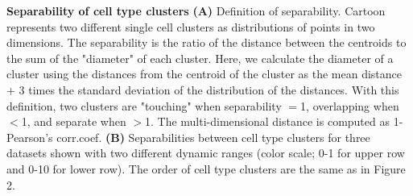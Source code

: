 \textbf{Separability of cell type clusters}
\textbf{(A)} Definition of separability. Cartoon represents two different single cell clusters as distributions of points in two dimensions. The separability is the ratio of the distance between the centroids to the sum of the "diameter" of each cluster. Here, we calculate the diameter of a cluster using the distances from the centroid of the cluster as the mean distance $+$ 3 times the standard deviation of the distribution of the distances. With this definition, two clusters are "touching" when separability $=$1, overlapping when $<$1, and separate when $>$1. The multi-dimensional distance is computed as 1- Pearson's corr.coef.
\textbf{(B)} Separabilities between cell type clusters for three datasets shown with two different dynamic ranges (color scale; 0-1 for upper row and 0-10 for lower row).  The order of cell type clusters are the same as in Figure 2.